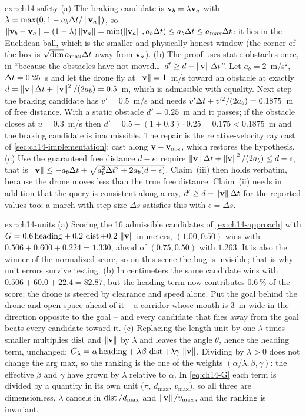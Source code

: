 \begin{solution}{exr:ch14-safety}
(a) The braking candidate is $\mathbf{v}_b = \lambda\mathbf{v}_a$ with $\lambda = \max(0, 1 - a_b\Delta t/\left\lVert \mathbf{v}_a \right\rVert)$, so $\left\lVert \mathbf{v}_b - \mathbf{v}_a \right\rVert = (1-\lambda)\left\lVert \mathbf{v}_a \right\rVert = \min(\left\lVert \mathbf{v}_a \right\rVert, a_b\Delta t) \le a_b\Delta t \le a_{\max}\Delta t$: it lies in the Euclidean ball, which is the smaller and physically honest window (the corner of the box is $\sqrt{\dim}\,a_{\max}\Delta t$ away from $\mathbf{v}_a$). (b) The proof uses static obstacles once, in ``because the obstacles have not moved\ldots\ $d' \ge d - \left\lVert \mathbf{v} \right\rVert\Delta t$''. Let $a_b = 2$~m/s$^2$, $\Delta t = 0.25$~s and let the drone fly at $\left\lVert \mathbf{v} \right\rVert = 1$~m/s toward an obstacle at exactly $d = \left\lVert \mathbf{v} \right\rVert\Delta t + \left\lVert \mathbf{v} \right\rVert^2/(2a_b) = 0.5$~m, which is admissible with equality. Next step the braking candidate has $v' = 0.5$~m/s and needs $v'\Delta t + v'^2/(2a_b) = 0.1875$~m of free distance. With a static obstacle $d' = 0.25$~m and it passes; if the obstacle closes at $u = 0.3$~m/s then $d' = 0.5 - (1 + 0.3)\cdot 0.25 = 0.175 < 0.1875$~m and the braking candidate is inadmissible. The repair is the relative-velocity ray cast of \cref{sec:ch14-implementation}: cast along $\mathbf{v} - \mathbf{v}_{\mathrm{obs}}$, which restores the hypothesis. (c) Use the guaranteed free distance $d - \epsilon$: require $\left\lVert \mathbf{v} \right\rVert\Delta t + \left\lVert \mathbf{v} \right\rVert^2/(2a_b) \le d - \epsilon$, that is $\left\lVert \mathbf{v} \right\rVert \le -a_b\Delta t + \sqrt{a_b^2\Delta t^2 + 2a_b(d-\epsilon)}$. Claim~(iii) then holds verbatim, because the drone moves less than the true free distance. Claim~(ii) needs in addition that the query is consistent along a ray, $d' \ge d - \left\lVert \mathbf{v} \right\rVert\Delta t$ for the reported values too; a march with step size $\Delta s$ satisfies this with $\epsilon = \Delta s$.
\end{solution}
\begin{solution}{exr:ch14-units}
(a) Scoring the 16 admissible candidates of \cref{ex:ch14-approach} with $G = 0.6\,\mathrm{heading} + 0.2\,\operatorname{dist} + 0.2\,\left\lVert \mathbf{v} \right\rVert$ in meters, $(1.00, 0.50)$ wins with $0.506 + 0.600 + 0.224 = 1.330$, ahead of $(0.75, 0.50)$ with $1.263$. It is also the winner of the normalized score, so on this scene the bug is invisible; that is why unit errors survive testing. (b) In centimeters the same candidate wins with $0.506 + 60.0 + 22.4 = 82.87$, but the heading term now contributes $0.6\,\%$ of the score: the drone is steered by clearance and speed alone. Put the goal behind the drone and open space ahead of it -- a corridor whose mouth is $3$~m wide in the direction opposite to the goal -- and every candidate that flies away from the goal beats every candidate toward it. (c) Replacing the length unit by one $\lambda$ times smaller multiplies $\operatorname{dist}$ and $\left\lVert \mathbf{v} \right\rVert$ by $\lambda$ and leaves the angle $\theta$, hence the heading term, unchanged: $G_\lambda = \alpha\,\mathrm{heading} + \lambda\beta\,\operatorname{dist} + \lambda\gamma\,\left\lVert \mathbf{v} \right\rVert$. Dividing by $\lambda > 0$ does not change the arg max, so the ranking is the one of the weights $(\alpha/\lambda, \beta, \gamma)$: the effective $\beta$ and $\gamma$ have grown by $\lambda$ relative to $\alpha$. In \cref{eq:ch14-G} each term is divided by a quantity in its own unit ($\pi$, $d_{\max}$, $v_{\max}$), so all three are dimensionless, $\lambda$ cancels in $\operatorname{dist}/d_{\max}$ and $\left\lVert \mathbf{v} \right\rVert/v_{\max}$, and the ranking is invariant.
\end{solution}
